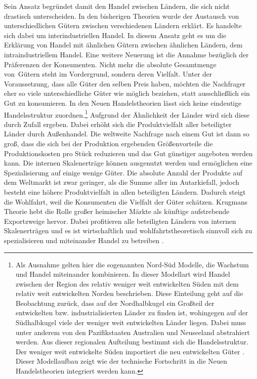 Sein Ansatz begr{\"u}ndet damit den Handel zwischen L{\"a}ndern, die sich nicht drastisch unterscheiden. In den bisherigen Theorien wurde der Austausch von unterschiedlichen G{\"u}tern zwischen verschiedenen L{\"a}ndern erkl{\"a}rt. Es handelte sich dabei um interindustriellen Handel. In diesem Ansatz geht es um die Erkl{\"a}rung von Handel mit {\"a}hnlichen G{\"u}tern zwischen {\"a}hnlichen L{\"a}ndern, dem intraindustriellem Handel. \newline Eine weitere Neuerung ist die Annahme bez{\"u}glich der Pr{\"a}ferenzen der Konsumenten. Nicht mehr die absolute Gesamtmenge von~G{\"u}tern steht im Vordergrund, sondern deren Vielfalt. Unter der Voraussetzung, dass alle Güter den selben Preis haben, möchten die  Nachfrager eher so viele unterschiedliche G{\"u}ter wie m{\"o}glich beziehen, statt ausschlie{\ss}lich ein Gut zu konsumieren. \newline In den Neuen Handelstheorien lässt sich keine eindeutige Handelsstruktur zuordnen.\footnote{Als Ausnahme gelten hier die sogenannten Nord-Süd Modelle, die Wachstum und Handel miteinander kombinieren. In dieser Modellart wird Handel zwischen der Region des relativ weniger weit entwickelten Süden mit dem relativ weit entwickelten Norden beschrieben. Diese Einteilung geht auf die Beobachtung zurück, dass auf der Nordhalbkugel ein Gro{\ss}teil der entwickelten bzw. industrialisierten Länder zu finden ist, wohingegen auf der Südhalbkugel viele der weniger weit entwickelten Länder liegen. Dabei muss unter anderem von den Pazifikstaaten Australien und Neuseeland abstrahiert werden. Aus dieser regionalen Aufteilung bestimmt sich die Handelsstruktur.  Der weniger weit entwickelte Süden importiert die neu entwickelten Güter \citep{Grossman.1991a,Krugman.1990}.
Dieser Modellaufbau zeigt wie der technische Fortschritt in die Neuen Handelstheorien integriert werden kann. 
 } Aufgrund der Ähnlichkeit der Länder wird sich diese durch Zufall ergeben. Dabei erh{\"o}ht sich die Produktvielfalt aller beteiligter L{\"a}nder durch Au{\ss}enhandel. Die weltweite Nachfrage nach einem Gut ist dann so gro{\ss}, dass die sich bei der Produktion ergebenden Gr{\"o}{\ss}envorteile die Produktionskosten pro Stück reduzieren und das Gut g{\"u}nstiger angeboten werden kann. Die internen Skalenertr{\"a}ge k{\"o}nnen ausgenutzt werden und erm{\"o}glichen eine Spezialisierung auf einige wenige G{\"u}ter. Die absolute Anzahl der Produkte auf dem Weltmarkt ist zwar geringer, als die Summe aller im Autarkiefall, jedoch besteht eine h{\"o}here Produktvielfalt in allen beteiligten L{\"a}ndern. Dadurch steigt die Wohlfahrt, weil die Konsumenten die Vielfalt der G{\"u}ter sch{\"a}tzen. Krugmans Theorie hebt die Rolle gro{\ss}er heimischer M{\"a}rkte als k{\"u}nftige aufstrebende Exportzweige hervor. Dabei profitieren alle beteiligten L{\"a}ndern von internen Skalenerträgen und es ist wirtschaftlich und wohlfahrtstheoretisch sinnvoll sich zu spezialisieren und miteinander Handel zu betreiben \citep{Krugman.79,Krugman.1983,Melvin.1969}.\newline 
